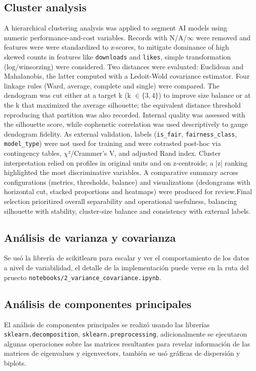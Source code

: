 \documentclass[journal]{IEEEtran}
\begin{document}
	\subsection{Cluster analysis}
	\label{methodology:cluanal}
	A hierarchical clustering analysis was applied to segment AI models using numeric performance-and-cost variables. Records with N/A/$\infty$ were removed and features were were standardized to z-scores, to mitigate dominance of high skewed counts in features like \texttt{downloads} and \texttt{likes}, simple transformation (log/winsorzing) were considered. Two distances were evaluated: Euclidean and Mahalanobis, the latter computed with a Ledoit-Wold covariance estimator. Four linkage rules (Ward, average, complete and single) were compared.
	The dendogram was cut either at a target k (k $\in{\{3,4\}}$) to improve size balance or at the k that maximized the average silhouette; the equivalent distance threshold reproducing that partition was also recorded. Internal quality was assessed with the silhouette score, while cophenetic correlation was used descriptively to gauge dendogram fidelity. As external validation, labels (\texttt{is\_fair}, \texttt{fairness\_class}, \texttt{model\_type}) were not used for training and were cotrasted post-hoc via contingency tables, $\chi$²/Crammer's V, and adjusted Rand index.
	Cluster interpretation relied on profiles in original units and on z-centroids; a |z| ranking highlighted the most discriminative variables. A comparative summary across configurations (metrics, thresholds, balance) and visualizations (dedongrams with horizontal cut, stacked proportions and heatmaps) were produced for review.Final selection prioritized overall separability and operational usefulness, balancing silhouette with stability, cluster-size balance and consistency with external labels. 

	\subsection{Análisis de varianza y covarianza}
	\label{ssec:pca}
	Se usó la librería de scikitlearn para escalar y ver el comportamiento de los datos a nivel de variabilidad, el detalle de la implementación puede verse en la ruta del pruecto \texttt{notebooks/2\_variance\_covariance.ipynb}.

	\subsection{Análisis de componentes principales}
	\label{ssec:pca}
	El análisis de componentes principales se realizó usando las librerías \texttt{sklearn.decomposition}, \texttt{sklearn.preprocessing}, adicionalmente se ejecutaron algunas operaciones sobre las matrices resultantes para revelar información de las matrices de eigenvalues y eigenvectors, también se usó gráficas de dispersión y biplots.
\end{document}
